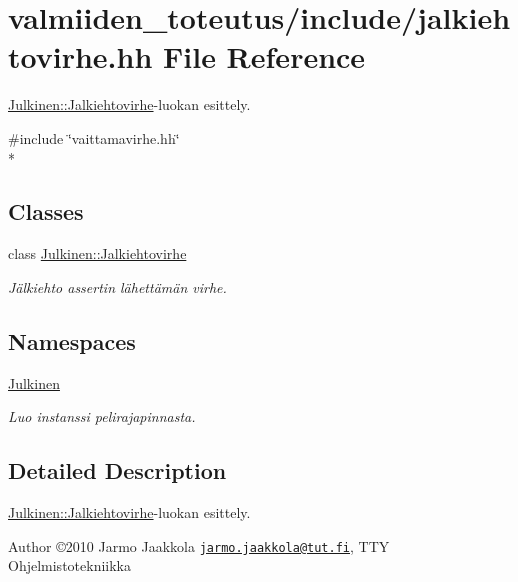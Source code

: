 \hypertarget{jalkiehtovirhe_8hh}{}\section{valmiiden\+\_\+toteutus/include/jalkiehtovirhe.hh File Reference}
\label{jalkiehtovirhe_8hh}


\hyperlink{class_julkinen_1_1_jalkiehtovirhe}{Julkinen\+::\+Jalkiehtovirhe}-\/luokan esittely.  


{\ttfamily \#include \char`\"{}vaittamavirhe.\+hh\char`\"{}}\\*
\subsection*{Classes}
\begin{DoxyCompactItemize}
\item 
class \hyperlink{class_julkinen_1_1_jalkiehtovirhe}{Julkinen\+::\+Jalkiehtovirhe}
\begin{DoxyCompactList}\small\item\em Jälkiehto assertin lähettämän virhe. \end{DoxyCompactList}\end{DoxyCompactItemize}
\subsection*{Namespaces}
\begin{DoxyCompactItemize}
\item 
 \hyperlink{namespace_julkinen}{Julkinen}
\begin{DoxyCompactList}\small\item\em Luo instanssi pelirajapinnasta. \end{DoxyCompactList}\end{DoxyCompactItemize}


\subsection{Detailed Description}
\hyperlink{class_julkinen_1_1_jalkiehtovirhe}{Julkinen\+::\+Jalkiehtovirhe}-\/luokan esittely. 

\begin{DoxyAuthor}{Author}
©2010 Jarmo Jaakkola \href{mailto:jarmo.jaakkola@tut.fi}{\tt jarmo.\+jaakkola@tut.\+fi}, T\+T\+Y Ohjelmistotekniikka 
\end{DoxyAuthor}
